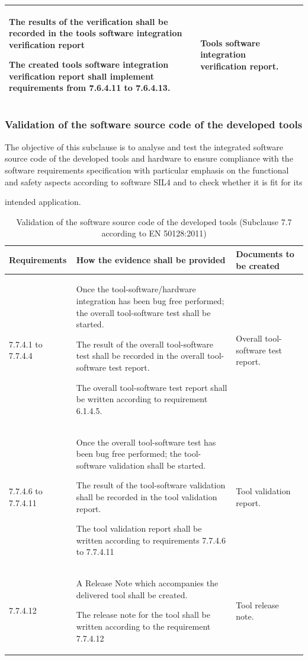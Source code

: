 \documentclass{template/openetcs_report}
\begin{document}
{\begin{longtable}{|p{2cm}|p{9cm}|p{3cm}|}
The results of the verification shall be recorded in the tools software integration verification report

The created tools software integration verification report shall implement requirements from 7.6.4.11 to 7.6.4.13.
& Tools software integration verification report.\\ 
\hline
\end{longtable}}



\subsubsection{Validation of the software source code of the developed tools}
\begin{flushleft}
 The objective of this subclause is to analyse and test the integrated software source code of the developed tools and hardware to ensure compliance with the software requirements specification with particular emphasis on the functional and safety aspects according to software SIL4 and to check whether it is fit for its
 \end{flushleft} intended application.
{\footnotesize\sffamily\centering
\begin{longtable}{|p{2cm}|p{9cm}|p{3cm}|}
\caption{Validation of the software source code of the developed tools (Subclause 7.7 according to EN 50128:2011)}\\
\hline
\bfseries Requirements & \bfseries How the evidence shall be provided & \bfseries Documents to be created\\
\hline
\hline
\endhead
\hline
\endfoot

7.7.4.1 to 7.7.4.4 & Once the tool-software/hardware integration has been bug free performed; the overall tool-software test shall be started.

The result of the overall tool-software test shall be recorded in the overall tool-software test report.

The overall tool-software test report shall be written according to requirement 6.1.4.5.

& Overall tool-software test report.\\ 
\hline
7.7.4.6 to 7.7.4.11 & Once the overall tool-software test has been bug free performed; the tool-software validation shall be started.

The result of the tool-software validation shall be recorded in the tool validation report.

The tool validation report shall be written according to requirements 7.7.4.6 to 7.7.4.11
& Tool validation report.\\ 
\hline
7.7.4.12 & A Release Note which accompanies the delivered tool shall be created.

The release note for the tool shall be written according to the requirement 7.7.4.12
& Tool release note.\\ 
\hline
\end{longtable}}
\end{document}
